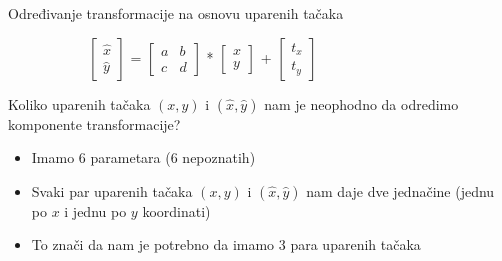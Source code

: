 \documentclass[bookmarks=true,bookmarksopen=true,pdfborder={0 0 0},pdfhighlight={/N},linkbordercolor={.5 .5 .5},implicit=false,unicode,xcolor={table}]{beamer}
\begin{document}
\begin{frame}{Određivanje transformacije na osnovu uparenih tačaka}

  \begin{figure}
    \begin{subfigure}{5cm}
      $\begin{bmatrix}
        \hat{x}\\
        \hat{y}
        \end{bmatrix}$
      =
      $\begin{bmatrix}
        a & b\\
        c & d
        \end{bmatrix}$
      *
      $\begin{bmatrix}
        x\\
        y
        \end{bmatrix}$
      + 
      $\begin{bmatrix}
        t_{x}\\
        t_{y}
        \end{bmatrix}$
    \end{subfigure}
  \end{figure}
  Koliko uparenih tačaka $(x, y)$ i $(\hat{x}, \hat{y})$ nam je neophodno da odredimo komponente transformacije?
  \begin{itemize}
    \item Imamo 6 parametara (6 nepoznatih)
    \item Svaki par uparenih tačaka $(x, y)$ i $(\hat{x}, \hat{y})$ nam daje dve jednačine (jednu po $x$ i jednu po $y$ koordinati)
    \item To znači da nam je potrebno da imamo 3 para uparenih tačaka
  \end{itemize}

\end{frame}
\end{document}
